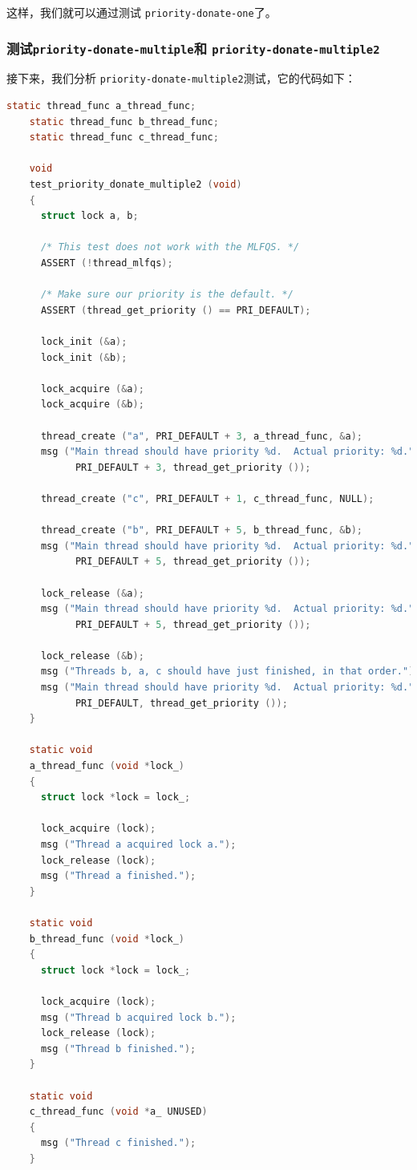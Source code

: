 \documentclass{article}
\begin{document}
这样，我们就可以通过测试 \texttt{priority-donate-one}了。

\subsubsection{测试\texttt{priority-donate-multiple}和 \texttt{priority-donate-multiple2}}

接下来，我们分析 \texttt{priority-donate-multiple2}测试，它的代码如下：

\begin{lstlisting}[language=C, title=\texttt{priority-donate-multiple2}测试]
    static thread_func a_thread_func;
    static thread_func b_thread_func;
    static thread_func c_thread_func;

    void
    test_priority_donate_multiple2 (void) 
    {
      struct lock a, b;

      /* This test does not work with the MLFQS. */
      ASSERT (!thread_mlfqs);

      /* Make sure our priority is the default. */
      ASSERT (thread_get_priority () == PRI_DEFAULT);

      lock_init (&a);
      lock_init (&b);

      lock_acquire (&a);
      lock_acquire (&b);

      thread_create ("a", PRI_DEFAULT + 3, a_thread_func, &a);
      msg ("Main thread should have priority %d.  Actual priority: %d.",
            PRI_DEFAULT + 3, thread_get_priority ());

      thread_create ("c", PRI_DEFAULT + 1, c_thread_func, NULL);

      thread_create ("b", PRI_DEFAULT + 5, b_thread_func, &b);
      msg ("Main thread should have priority %d.  Actual priority: %d.",
            PRI_DEFAULT + 5, thread_get_priority ());

      lock_release (&a);
      msg ("Main thread should have priority %d.  Actual priority: %d.",
            PRI_DEFAULT + 5, thread_get_priority ());

      lock_release (&b);
      msg ("Threads b, a, c should have just finished, in that order.");
      msg ("Main thread should have priority %d.  Actual priority: %d.",
            PRI_DEFAULT, thread_get_priority ());
    }

    static void
    a_thread_func (void *lock_) 
    {
      struct lock *lock = lock_;

      lock_acquire (lock);
      msg ("Thread a acquired lock a.");
      lock_release (lock);
      msg ("Thread a finished.");
    }

    static void
    b_thread_func (void *lock_) 
    {
      struct lock *lock = lock_;

      lock_acquire (lock);
      msg ("Thread b acquired lock b.");
      lock_release (lock);
      msg ("Thread b finished.");
    }

    static void
    c_thread_func (void *a_ UNUSED) 
    {
      msg ("Thread c finished.");
    }

\end{lstlisting}
\end{document}
